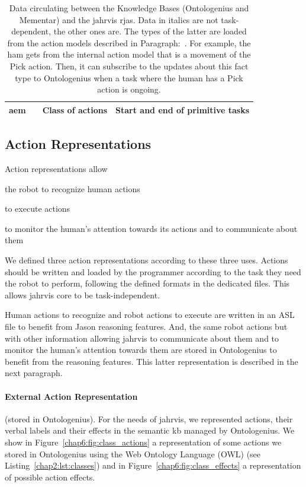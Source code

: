 \documentclass[a4paper,11pt,twoside]{StyleThese}
\begin{document}
\begin{landscape}
\begin{table}[]
\begin{tabular}{p{}||p{}|p{}|p{}|}
		\acrlong{aem} &
		&
		Class of actions &
		Start and end of primitive tasks \\ \hline
		
	\end{tabular}
	\caption{Data circulating between the Knowledge Bases (Ontologenius and Mementar) and the \acrshort{jahrvis} \acrshort{rja}s. Data in italics are not task-dependent, the other ones are. The types of the latter are loaded from the action models described in Paragraph:~. For example, the \acrlong{ham} gets from the internal action model that  is a movement of the Pick action. Then, it can subscribe to the updates about this fact type to Ontologenius when a task where the human has a Pick action is ongoing.}
	\label{chap6:tab:data}
\end{table}
\end{landscape}

\subsection{Action Representations}\label{chap6:subsec:action_rep}
Action representations allow 
\begin{bulletList}
	\item the robot to recognize human actions
	\item to execute actions
	\item to monitor the human's attention towards its actions and to communicate about them
\end{bulletList} 

We defined three action representations according to these three uses. Actions should be written and loaded by the programmer according to the task they need the robot to perform, following the defined formats in the dedicated files. This allows \acrshort{jahrvis} core to be task-independent.

Human actions to recognize and robot actions to execute are written in an ASL file to benefit from Jason reasoning features. And, the same robot actions but with other information allowing \acrshort{jahrvis} to communicate about them and to monitor the human's attention towards them are stored in Ontologenius to benefit from the reasoning features. This latter representation is described in the next paragraph.

\paragraph{External Action Representation} (\ie stored in Ontologenius).
For the needs of \acrshort{jahrvis}, we represented actions, their verbal labels and their effects in the semantic \acrshort{kb} managed by Ontologenius. We show in Figure~\ref{chap6:fig:class_actions} a representation of some actions we stored in Ontologenius using the Web Ontology Language (OWL) (see Listing~\ref{chap2:lst:classes}) and in Figure~\ref{chap6:fig:class_effects} a representation of possible action effects.
\end{document}
